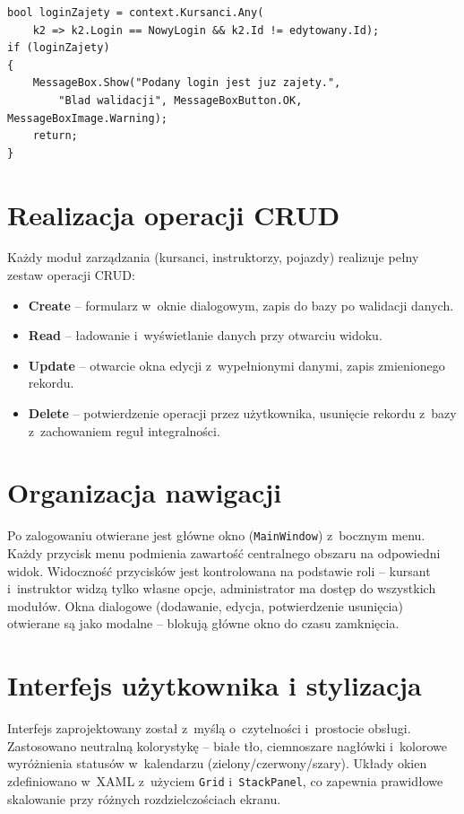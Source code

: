 \begin{lstlisting}[language={[Sharp]C}, caption={Sprawdzanie unikalności loginu przy edycji}, label=lst:unique_login]
bool loginZajety = context.Kursanci.Any(
    k2 => k2.Login == NowyLogin && k2.Id != edytowany.Id);
if (loginZajety)
{
    MessageBox.Show("Podany login jest juz zajety.",
        "Blad walidacji", MessageBoxButton.OK, MessageBoxImage.Warning);
    return;
}
\end{lstlisting}

\section{Realizacja operacji CRUD}

Ka\.{z}dy modu\l{} zarz\k{a}dzania (kursanci, instruktorzy, pojazdy)
realizuje pe\l{}ny zestaw operacji CRUD:
\begin{itemize}
  \item \textbf{Create} -- formularz w~oknie dialogowym, zapis do bazy po walidacji danych.
  \item \textbf{Read} -- \l{}adowanie i~wy\'{s}wietlanie danych przy otwarciu widoku.
  \item \textbf{Update} -- otwarcie okna edycji z~wype\l{}nionymi danymi,
        zapis zmienionego rekordu.
  \item \textbf{Delete} -- potwierdzenie operacji przez u\.{z}ytkownika,
        usuni\k{e}cie rekordu z~bazy z~zachowaniem regu\l{} integralno\'{s}ci.
\end{itemize}

\section{Organizacja nawigacji}

Po zalogowaniu otwierane jest g\l{}\'{o}wne okno (\texttt{MainWindow})
z~bocznym menu. Ka\.{z}dy przycisk menu podmienia zawarto\'{s}\'{c} centralnego
obszaru na odpowiedni widok. Widoczno\'{s}\'{c} przycisk\'{o}w jest
kontrolowana na podstawie roli -- kursant i~instruktor widz\k{a} tylko
w\l{}asne opcje, administrator ma dost\k{e}p do wszystkich modu\l{}\'{o}w.
Okna dialogowe (dodawanie, edycja, potwierdzenie usuni\k{e}cia) otwierane
s\k{a} jako modalne -- blokuj\k{a} g\l{}\'{o}wne okno do czasu zamkni\k{e}cia.

\section{Interfejs u\.{z}ytkownika i stylizacja}

Interfejs zaprojektowany zosta\l{} z~my\'{s}l\k{a} o~czytelno\'{s}ci i~prostocie
obs\l{}ugi. Zastosowano neutraln\k{a} kolorystyk\k{e} -- bia\l{}e t\l{}o,
ciemnoszare nag\l{}\'{o}wki i~kolorowe wyr\'{o}\.{z}nienia status\'{o}w
w~kalendarzu (zielony/czerwony/szary). Uk\l{}ady okien zdefiniowano
w~XAML z~u\.{z}yciem \texttt{Grid} i~\texttt{StackPanel}, co zapewnia
prawid\l{}owe skalowanie przy r\'{o}\.{z}nych rozdzielczo\'{s}ciach ekranu.